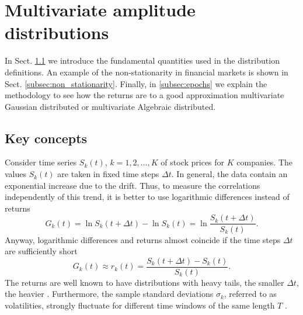 \section{Multivariate amplitude distributions}
\label{sec:epochs}

In Sect. \ref{subsec:key_concepts} we introduce the fundamental quantities
used in the distribution definitions. An example of the non-stationarity in
financial markets is shown in Sect. \ref{subsec:non_stationarity}. Finally, in
\ref{subsec:epochs} we explain the methodology to see how the returns are to a
good approximation multivariate Gaussian distributed or multivariate Algebraic
distributed.

\subsection{Key concepts}\label{subsec:key_concepts}

Consider time series $S_{k} \left( t \right)$, $k = 1, 2, \ldots, K$ of stock
prices for $K$ companies. The values $S_{k} \left( t \right)$ are taken in
fixed time steps $\Delta t$. In general, the data contain an exponential
increase due to the drift. Thus, to measure the correlations independently of
this trend, it is better to use logarithmic differences instead of returns
\begin{equation}
    G_{k} \left( t \right) = \ln S_{k} \left( t + \Delta t \right) -
    \ln S_{k} \left(t \right) = \ln \frac{S_{k} \left( t + \Delta t \right)}
    {S_{k} \left(t \right)}.
\end{equation}
Anyway, logarithmic differences and returns almost coincide if the time steps
$\Delta t$ are sufficiently short \cite{subtle_nature,empirical_facts}
\begin{equation}
    G_{k} \left(t\right) \approx r_{k} \left(t\right)
    = \frac{S_{k} \left( t + \Delta t \right) - S_{k} \left( t \right)}
    {S_{k} \left( t \right)}.
\end{equation}
The returns are well known to have distributions with heavy tails, the smaller
$\Delta t$, the heavier
\cite{non_stationarity_fin_guhr}. Furthermore, the sample standard deviations
$\sigma_{k}$, referred to as volatilities, strongly fluctuate for different
time windows of the same length $T$
\cite{non_stationarity_fin_guhr,volatility_change}.

